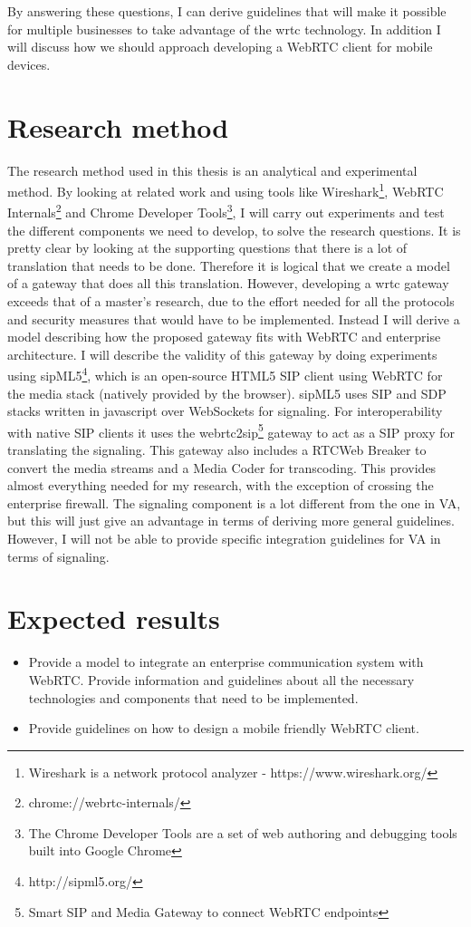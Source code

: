 By answering these questions, I can derive guidelines that will make it possible for multiple businesses to take advantage of the \gls{wrtc} technology. In addition I will discuss how we should approach developing a WebRTC client for mobile devices.


\section{Research method}
The research method used in this thesis is an analytical and experimental method. By looking at related work and using tools like Wireshark\footnote{Wireshark is a network protocol analyzer - https://www.wireshark.org/}, WebRTC Internals\footnote{chrome://webrtc-internals/} and Chrome Developer Tools\footnote{The Chrome Developer Tools are a set of web authoring and debugging tools built into Google Chrome}, I will carry out experiments and test the different components we need to develop, to solve the research questions. It is pretty clear by looking at the supporting questions that there is a lot of translation that needs to be done. Therefore it is logical that we create a model of a gateway that does all this translation. However, developing a \gls{wrtc} gateway exceeds that of a master's research, due to the effort needed for all the protocols and security measures that would have to be implemented. Instead I will derive a model describing how the proposed gateway fits with WebRTC and enterprise architecture. I will describe the validity of this gateway by doing experiments using sipML5\footnote{http://sipml5.org/}, which is an open-source HTML5 SIP client using WebRTC for the media stack (natively provided by the browser). sipML5 uses SIP and SDP stacks written in javascript over WebSockets for signaling. For interoperability with native SIP clients it uses the webrtc2sip\footnote{Smart SIP and Media Gateway to connect WebRTC endpoints} gateway to act as a SIP proxy for translating the signaling. This gateway also includes a RTCWeb Breaker to convert the media streams and a Media Coder for transcoding. This provides almost everything needed for my research, with the exception of crossing the enterprise firewall. The signaling component is a lot different from the one in VA, but this will just give an advantage in terms of deriving more general guidelines. However, I will not be able to provide specific integration guidelines for VA in terms of signaling.

\section{Expected results}

\begin{itemize}
		\item Provide a model to integrate an enterprise communication system with WebRTC. Provide information and guidelines about all the necessary technologies and components that need to be implemented.
		\item Provide guidelines on how to design a mobile friendly WebRTC client.
\end{itemize}
